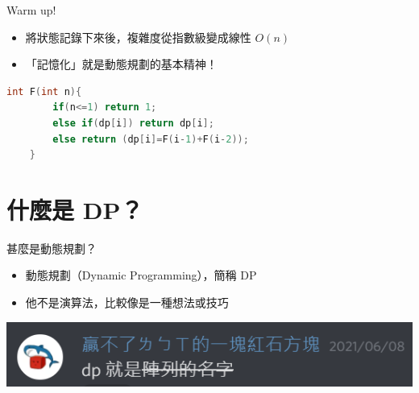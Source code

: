\documentclass[aspectratio=169]{beamer}
\begin{document}
    \begin{frame}[fragile]{Warm up!}
        \begin{itemize}
            \item 將狀態記錄下來後，複雜度從指數級變成線性 $O(n)$
            \item<2-> 「記憶化」就是動態規劃的基本精神！
        \end{itemize} 
        \begin{lstlisting}[language=C++, basicstyle= \ttfamily \small]
    int F(int n){
        if(n<=1) return 1;
        else if(dp[i]) return dp[i];
        else return (dp[i]=F(i-1)+F(i-2));
    }
        \end{lstlisting}
    \end{frame}
    
    \section{什麼是 DP？}
    

    \begin{frame}{甚麼是動態規劃？}
        \begin{itemize}
            \item 動態規劃（Dynamic Programming），簡稱 DP \pause
            \item<2-> 他不是演算法，比較像是一種想法或技巧 \pause
        \end{itemize}
        \vspace{5mm}
        \begin{center}
            \includegraphics[]{images/dp_name_of_array.png}
        \end{center}
    \end{frame}
\end{document}
